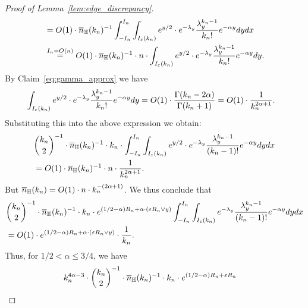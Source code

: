 \begin{proof}[Proof of Lemma~\ref{lem:edge_discrepancy}]
\begin{equation*}
\begin{split}
&= O(1) \cdot \overline{n}_{\mathbb{H}}(k_n)^{-1}
\int_{-I_n}^{I_n} \int_{I_\varepsilon (k_n)} 
e^{y/2} \cdot e^{-\lambda_y} 
\frac{\lambda_y^{k_n-1}}{k_n!} e^{-\alpha y} dy dx \\ 
&\stackrel{I_n = O(n)}{=}  O(1) \cdot \overline{n}_{\mathbb{H}}(k_n)^{-1} \cdot  n \cdot 
\int_{I_\varepsilon (k_n)} e^{y/2} \cdot e^{-\lambda_y} 
\frac{\lambda_y^{k_n-1}}{k_n!} e^{-\alpha y}dy. 
\end{split}
\end{equation*}
By Claim~\ref{eq:gamma_approx} we have
\begin{equation*} 
\begin{split} 
&\int_{I_\varepsilon (k_n)} e^{y/2} \cdot e^{-\lambda_y} \frac{\lambda_y^{k_n-1}}{k_n!} e^{-\alpha y} dy= 
O(1) \cdot \frac{\Gamma(k_n- 2\alpha)}{\Gamma (k_n+1)} = O(1) \cdot 
\frac{1}{k_n^{2\alpha +1}}.
\end{split}
\end{equation*}
Substituting this into the above expression we obtain: 
\begin{equation*}
\begin{split}
&{k_n \choose 2}^{-1} \cdot \overline{n}_{\mathbb{H}}(k_n)^{-1} \cdot k_n \cdot 
\int_{-I_n}^{I_n} \int_{I_\varepsilon (k_n)} e^{y/2} \cdot 
e^{-\lambda_y} 
\frac{\lambda_y^{k_n-1}}{(k_n-1)!} e^{-\alpha y} dy dx \\ 
&=O(1) \cdot  \overline{n}_{\mathbb{H}}(k_n)^{-1} \cdot n \cdot  
\frac{1}{k_n^{2\alpha +1}}.
\end{split}
\end{equation*}
But $\overline{n}_{\mathbb{H}}(k_n) = O(1) \cdot n \cdot k_n^{-(2\alpha +1)}$. 
We thus conclude that 
\begin{equation*}
\begin{split}
&{k_n \choose 2}^{-1} \cdot \overline{n}_{\mathbb{H}}(k_n)^{-1} \cdot k_n \cdot 
e^{(1/2 - \alpha)R_n + \alpha \cdot (\varepsilon R_n \vee y)}
\int_{-I_n}^{I_n} \int_{I_\varepsilon (k_n)} 
e^{-\lambda_y} 
\frac{\lambda_y^{k_n-1}}{(k_n-1)!} e^{-\alpha y} dy dx \\ 
&=O(1) \cdot  e^{(1/2 - \alpha)R_n + \alpha \cdot (\varepsilon R_n \vee y)} \cdot 
\frac{1}{k_n}.
\end{split}
\end{equation*}
Thus, for $1/2 < \alpha \leq3/4$, we have 
\begin{equation} \label{eq:2nd_term-1st_regime}
\begin{split}
&k_n^{4 \alpha -3} \cdot 
{k_n \choose 2}^{-1} \cdot \expH^{-1} \cdot k_n \cdot 
e^{(1/2 - \alpha)R_n + \eps R_n}

\end{split}
\end{equation}
\end{proof}
